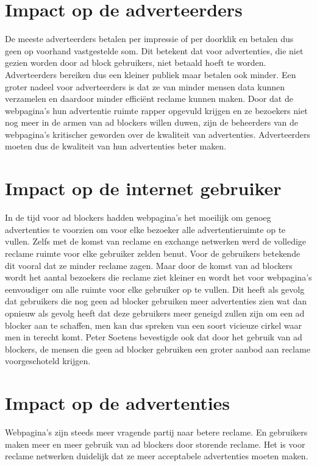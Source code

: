 \documentclass[pdftex,a4paper,12pt,twoside]{report}
\begin{document}
\section{Impact op de adverteerders}
\label{sec:Impact op de adverteerders}
De meeste adverteerders betalen per impressie of per doorklik en betalen dus geen op voorhand vastgestelde som. Dit betekent dat voor advertenties, die niet gezien worden door ad block gebruikers, niet betaald hoeft te worden. Adverteerders bereiken dus een kleiner publiek maar betalen ook minder. Een groter nadeel voor adverteerders is dat ze van minder mensen data kunnen verzamelen en daardoor minder efficiënt reclame kunnen maken.
Door dat de webpagina's hun advertentie ruimte rapper opgevuld krijgen en ze bezoekers niet nog meer in de armen van ad blockers willen duwen, zijn de beheerders van de webpagina's kritischer geworden over de kwaliteit van advertenties. Adverteerders moeten dus de kwaliteit van hun advertenties beter maken.
\section{Impact op de internet gebruiker}
\label{sec:Impact op de internet gebruiker}
In de tijd voor ad blockers hadden webpagina's het moeilijk om genoeg advertenties te voorzien om voor elke bezoeker alle advertentieruimte op te vullen. Zelfs met de komst van reclame en exchange netwerken werd de volledige reclame ruimte voor elke gebruiker zelden benut. Voor de gebruikers betekende dit vooral dat ze minder reclame zagen. Maar door de komst van ad blockers wordt het aantal bezoekers die reclame ziet kleiner en wordt het voor webpagina's eenvoudiger om alle ruimte voor elke gebruiker op te vullen. Dit heeft als gevolg dat gebruikers die nog geen ad blocker gebruiken meer advertenties zien wat dan opnieuw als gevolg heeft dat deze gebruikers meer geneigd zullen zijn om een ad blocker aan te schaffen, men kan dus spreken van een soort vicieuze cirkel waar men in terecht komt. Peter Soetens bevestigde ook dat door het gebruik van ad blockers, de mensen die geen ad blocker gebruiken een groter aanbod aan reclame voorgeschoteld krijgen.
\section{Impact op de advertenties}
\label{sec:Impact op de advertenties}
Webpagina's zijn steeds meer vragende partij naar betere reclame. En gebruikers maken meer en meer gebruik van ad blockers door storende reclame. Het is voor reclame netwerken duidelijk dat ze meer acceptabele advertenties moeten maken.
\end{document}
